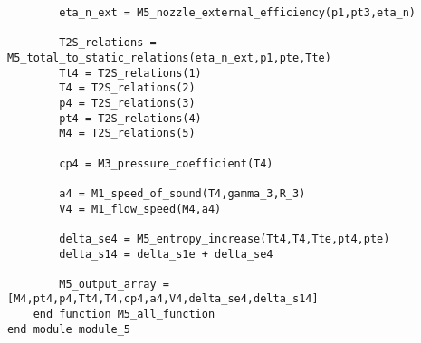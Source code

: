 \begin{verbatim}
        eta_n_ext = M5_nozzle_external_efficiency(p1,pt3,eta_n)
        
        T2S_relations = M5_total_to_static_relations(eta_n_ext,p1,pte,Tte)
        Tt4 = T2S_relations(1)
        T4 = T2S_relations(2)
        p4 = T2S_relations(3)
        pt4 = T2S_relations(4)
        M4 = T2S_relations(5)

        cp4 = M3_pressure_coefficient(T4)

        a4 = M1_speed_of_sound(T4,gamma_3,R_3)
        V4 = M1_flow_speed(M4,a4)

        delta_se4 = M5_entropy_increase(Tt4,T4,Tte,pt4,pte)
        delta_s14 = delta_s1e + delta_se4

        M5_output_array = [M4,pt4,p4,Tt4,T4,cp4,a4,V4,delta_se4,delta_s14]
    end function M5_all_function
end module module_5
\end{verbatim}